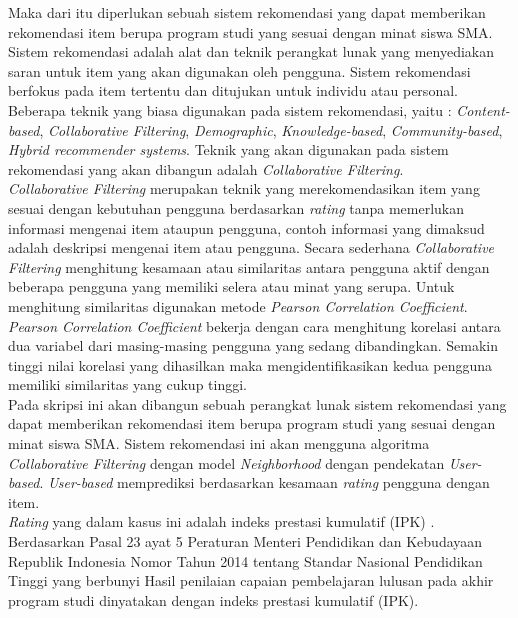 Maka dari itu diperlukan sebuah sistem rekomendasi yang dapat memberikan rekomendasi item berupa program studi yang sesuai dengan minat siswa SMA. Sistem rekomendasi adalah alat dan teknik perangkat lunak yang menyediakan saran untuk item yang akan digunakan oleh pengguna. Sistem rekomendasi berfokus pada item tertentu dan ditujukan untuk individu atau personal. Beberapa teknik yang biasa digunakan pada sistem rekomendasi, yaitu : \textit{Content-based}, \textit{Collaborative Filtering}, \textit{Demographic}, \textit{Knowledge-based}, \textit{Community-based}, \textit{Hybrid recommender systems}. Teknik yang akan digunakan pada sistem rekomendasi yang akan dibangun adalah \textit{Collaborative Filtering}.\\

\textit{Collaborative Filtering} merupakan teknik yang merekomendasikan item yang sesuai dengan kebutuhan pengguna berdasarkan \textit{rating} tanpa memerlukan informasi mengenai item ataupun pengguna, contoh informasi yang dimaksud adalah deskripsi mengenai item atau pengguna. Secara sederhana \textit{Collaborative Filtering} menghitung kesamaan atau similaritas antara pengguna aktif dengan beberapa pengguna yang memiliki selera atau minat yang serupa. Untuk menghitung similaritas digunakan metode \textit{Pearson Correlation Coefficient}. \textit{Pearson Correlation Coefficient} bekerja dengan cara menghitung korelasi antara dua variabel dari masing-masing pengguna yang sedang dibandingkan. Semakin tinggi nilai korelasi yang dihasilkan maka mengidentifikasikan kedua pengguna memiliki similaritas yang cukup tinggi. \\
 
Pada skripsi ini akan dibangun sebuah perangkat lunak sistem rekomendasi yang dapat memberikan rekomendasi item berupa program studi yang sesuai dengan minat siswa SMA. Sistem rekomendasi ini akan mengguna algoritma \textit{Collaborative Filtering} dengan model \textit{Neighborhood} dengan pendekatan \textit{User-based}. \textit{User-based} memprediksi berdasarkan kesamaan \textit{rating} pengguna dengan item. \\

\textit{Rating} yang dalam kasus ini adalah indeks prestasi kumulatif (IPK) . Berdasarkan Pasal 23 ayat 5 Peraturan Menteri Pendidikan dan Kebudayaan Republik Indonesia Nomor Tahun 2014 tentang Standar Nasional Pendidikan Tinggi yang berbunyi Hasil penilaian capaian pembelajaran lulusan pada akhir program studi dinyatakan dengan indeks prestasi kumulatif (IPK).

